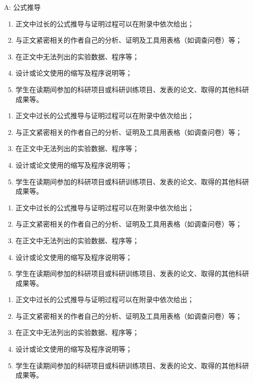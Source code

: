 \documentclass{document}
\begin{document}
\begin{cquappendix}{A: 公式推导}
    \begin{enumerate}
        \item 正文中过长的公式推导与证明过程可以在附录中依次给出；
        \item 与正文紧密相关的作者自己的分析、证明及工具用表格（如调查问卷）等；
        \item 在正文中无法列出的实验数据、程序等；
        \item 设计或论文使用的缩写及程序说明等；
        \item 学生在读期间参加的科研项目或科研训练项目、发表的论文、取得的其他科研成果等。
    \end{enumerate}

    \begin{enumerate}
        \item 正文中过长的公式推导与证明过程可以在附录中依次给出；
        \item 与正文紧密相关的作者自己的分析、证明及工具用表格（如调查问卷）等；
        \item 在正文中无法列出的实验数据、程序等；
        \item 设计或论文使用的缩写及程序说明等；
        \item 学生在读期间参加的科研项目或科研训练项目、发表的论文、取得的其他科研成果等。
    \end{enumerate}

    \begin{enumerate}
        \item 正文中过长的公式推导与证明过程可以在附录中依次给出；
        \item 与正文紧密相关的作者自己的分析、证明及工具用表格（如调查问卷）等；
        \item 在正文中无法列出的实验数据、程序等；
        \item 设计或论文使用的缩写及程序说明等；
        \item 学生在读期间参加的科研项目或科研训练项目、发表的论文、取得的其他科研成果等。
    \end{enumerate}

    \begin{enumerate}
        \item 正文中过长的公式推导与证明过程可以在附录中依次给出；
        \item 与正文紧密相关的作者自己的分析、证明及工具用表格（如调查问卷）等；
        \item 在正文中无法列出的实验数据、程序等；
        \item 设计或论文使用的缩写及程序说明等；
        \item 学生在读期间参加的科研项目或科研训练项目、发表的论文、取得的其他科研成果等。
    \end{enumerate}


\end{cquappendix}
\end{document}
